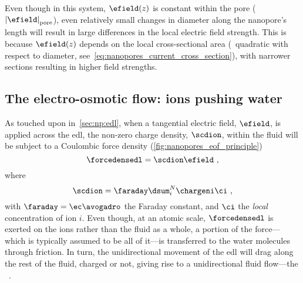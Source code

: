 %
Even though in this system, $\efield (z)$ is constant within the pore ($\left| \efield
\right|_{\text{pore}}$), even relatively small changes in diameter along the nanopore's length will result in
large differences in the local electric field strength. This is because $\efield (z)$ depends on the local
cross-sectional area (\ie~quadratic with respect to diameter, see~\cref{eq:nanopores_current_cross_section}),
with narrower sections resulting in higher field strengths.


\subsection{The electro-osmotic flow: ions pushing water}
%
\label{sec:np:eof}
%

As touched upon in~\cref{sec:np:edl}, when a tangential electric field, $\efield$, is applied across the
\gls{edl}, the non-zero charge density, $\scdion$, within the fluid will be subject to a Coulombic force
density (\cref{fig:nanopores_eof_principle})
%
\begin{equation}\label{eq:nanopores_edl_force}
  \forcedensedl = \scdion \efield
  \text{ ,}
\end{equation}
%
where
%
\begin{equation}\label{eq:nanopores_ion_scd}
  \scdion = \faraday \dsum_i^N \chargeni \ci
  \text{ ,}
\end{equation}
%
with $\faraday = \ec \avogadro$ the Faraday constant, and $\ci$ the \emph{local} concentration of ion $i$.
Even though, at an atomic scale, $\forcedensedl$ is exerted on the ions rather than the fluid as a whole, a
portion of the force---which is typically assumed to be all of it---is transferred to the water molecules through
friction. In turn, the unidirectional movement of the \gls{edl} will drag along the rest of the fluid, charged
or not, giving rise to a unidirectional fluid flow---the ~\cite{Bocquet-2010}.


